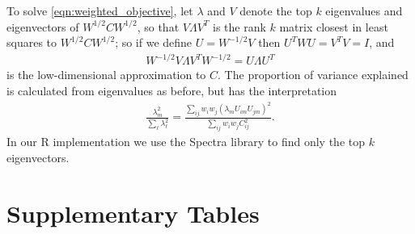 \documentclass[11pt, oneside]{article}   	%
\newif\ifsubmission
\newcommand\citep{\cite}
\begin{document}
To solve \eqref{eqn:weighted_objective},
let $\lambda$ and $V$ denote the top $k$ eigenvalues and eigenvectors of $W^{1/2} C W^{1/2}$,
so that $V \Lambda V^T$ is the rank $k$ matrix closest in least squares to $W^{1/2} C W^{1/2}$;
so if we define $U = W^{-1/2} V$
then $U^T W U = V^T V = I$,
and 
\begin{align*}
    W^{-1/2} V \Lambda V^T W^{-1/2} 
    =
    U \Lambda U^T
\end{align*}
is the low-dimensional approximation to $C$.
The proportion of variance explained is calculated from eigenvalues as before,
but has the interpretation
\begin{align*}
    \frac{ \lambda_m^2 }{ \sum_\ell \lambda_\ell^2 } 
    = 
    \frac{ \sum_{ij} w_i w_j ( \lambda_m U_{im} U_{jm} )^2 }{ \sum_{ij} w_i w_j C_{ij}^2 } .
\end{align*}
In our R implementation we use the Spectra library \citep{qiu2016rspectra}
to find only the top $k$ eigenvectors.

\ifsubmission
    \listoffigures
    \clearpage
\fi

\section{Supplementary Tables}
\end{document}
